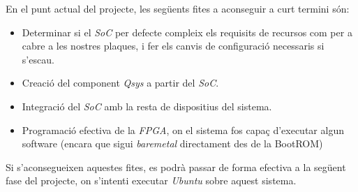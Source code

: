 \documentclass{article}
\begin{document}
En el punt actual del projecte, les següents fites a aconseguir a curt termini són:
\begin{itemize}
    \item Determinar si el \textit{SoC} per defecte compleix els requisits de recursos com per a cabre a les nostres plaques, i fer els canvis de configuració necessaris si s'escau.
    \item Creació del component \textit{Qsys} a partir del \textit{SoC}.
    \item Integració del \textit{SoC} amb la resta de dispositius del sistema.
    \item Programació efectiva de la \textit{FPGA}, on el sistema fos capaç d'executar algun software (encara que sigui \textit{baremetal} directament des de la BootROM)
\end{itemize}

Si s'aconsegueixen aquestes fites, es podrà passar de forma efectiva a la següent fase del projecte, on s'intenti executar \textit{Ubuntu} sobre aquest sistema.


\end{document}
